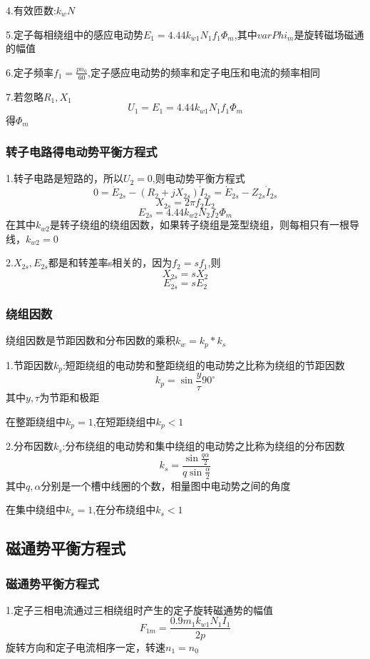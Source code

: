 \documentclass[11pt,twoside,a4paper]{ctexart}
\begin{document}
4.有效匝数:$k_wN$

5.定子每相绕组中的感应电动势$E_1 = 4.44k_{w1}N_1f_1\varPhi _m$,其中$varPhi _m$是旋转磁场磁通的幅值

6.定子频率$f_1 = \frac{pn_0}{60}$,定子感应电动势的频率和定子电压和电流的频率相同

7.若忽略$R_1,X_1$
\[U_1 = E_1 = 4.44k_{w1}N_1f_1\varPhi _m\]
得$\varPhi _m$

\subsubsection{转子电路得电动势平衡方程式}

1.转子电路是短路的，所以$U_2 = 0$,则电动势平衡方程式
\[0 = \dot{E}_{2s} - (R_2 + jX_{2s})\dot{I}_{2s} = \dot{E}_{2s} - Z_{2s}\dot{I}_{2s}\]
\[X_{2s} = 2\pi f_2L_2\]
\[E_{2s} = 4.44k_{w2}N_2f_2\varPhi _m\]
在其中$k_{w2}$是转子绕组的绕组因数，如果转子绕组是笼型绕组，则每相只有一根导线，$k_{w2} = 0$

2.$X_{2s},E_{2s}$都是和转差率s相关的，因为$f_2 = sf_1$,则
\[X_{2s} = sX_2\]
\[E_{2s} = sE_2\]

\subsubsection{绕组因数}
绕组因数是节距因数和分布因数的乘积$k_w = k_p*k_s$

1.节距因数$k_p$:短距绕组的电动势和整距绕组的电动势之比称为绕组的节距因数
\[k_p =\sin \frac{y}{\tau }90^\circ \]
其中$y,\tau $为节距和极距

在整距绕组中$k_p = 1$,在短距绕组中$k_p < 1$

2.分布因数$k_s$:分布绕组的电动势和集中绕组的电动势之比称为绕组的分布因数
\[k_s = \frac{\sin \frac{q\alpha }{2}}{q\sin \frac{\alpha}{2}}\]
其中$q,\alpha$分别是一个槽中线圈的个数，相量图中电动势之间的角度

在集中绕组中$k_s = 1$,在分布绕组中$k_s < 1$

\subsection{磁通势平衡方程式}

\subsubsection{磁通势平衡方程式}

1.定子三相电流通过三相绕组时产生的定子旋转磁通势的幅值
\[F_{1m} = \frac{0.9m_1k_{w1}N_1I_1}{2p}\]
旋转方向和定子电流相序一定，转速$n_1 = n_0$
\end{document}
